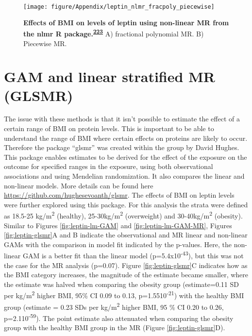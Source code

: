 \documentclass[11pt,twoside]{bristolthesis}
\begin{document}
\begin{figure}

{\centering \texttt{[image: figure/Appendix/leptin\_nlmr\_fracpoly\_piecewise]} 

}

\caption[Effects of BMI on levels of leptin using non-linear MR]{\textbf{Effects of BMI on levels of leptin using non-linear MR from the nlmr R package.\textsuperscript{\protect\hyperlink{ref-Staley2017}{223}}} A) fractional polynomial MR. B) Piecewise MR.}\label{fig:leptin-nlmr}
\end{figure}
\hypertarget{gam-and-linear-stratified-mr-glsmr}{%
\section{GAM and linear stratified MR (GLSMR)}\label{gam-and-linear-stratified-mr-glsmr}}

The issue with these methods is that it isn't possible to estimate the effect of a certain range of BMI on protein levels. This is important to be able to understand the range of BMI where certain effects on proteins are likely to occur. Therefore the package ``glsmr'' was created within the group by David Hughes. This package enables estimates to be derived for the effect of the exposure on the outcome for specified ranges in the exposure, using both observational associations and using Mendelian randomization. It also compares the linear and non-linear models. More details can be found here \url{https://github.com/hughesevoanth/glsmr}. The effects of BMI on leptin levels were further explored using this package. For this analysis the strata were defined as 18.5-25 kg/m\textsuperscript{2} (healthy), 25-30kg/m\textsuperscript{2} (overweight) and 30-40kg/m\textsuperscript{2} (obesity). Similar to Figures \ref{fig:leptin-lm-GAM} and \ref{fig:leptin-lm-GAM-MR}, Figures \ref{fig:leptin-glsmr}A and B indicate the observational and MR linear and non-linear GAMs with the comparison in model fit indicated by the p-values. Here, the non-linear GAM is a better fit than the linear model (p=5.4x10\textsuperscript{-43}), but this was not the case for the MR analysis (p=0.07). Figure \ref{fig:leptin-glsmr}C indicates how as the BMI category increases, the magnitude of the estimate became smaller, where the estimate was halved when comparing the obesity group (estimate=0.11 SD per kg/m\textsuperscript{2} higher BMI, 95\% CI 0.09 to 0.13, p=1.5510\textsuperscript{-21}) with the healthy BMI group (estimate = 0.23 SDs per kg/m\textsuperscript{2} higher BMI, 95 \% CI 0.20 to 0.26, p=2.110\textsuperscript{-59}). The point estimate also attenuated when comparing the obesity group with the healthy BMI group in the MR (Figure \ref{fig:leptin-glsmr}D).
\end{document}
